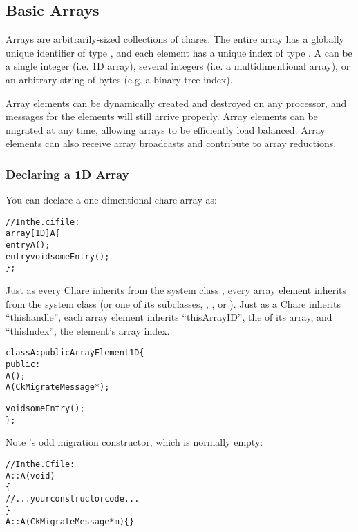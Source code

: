 \subsection{Basic Arrays}

Arrays  are arbitrarily-sized collections of chares.  The
entire array has a globally unique identifier of type , and
each element has a unique index of type .  A 
can be a single integer (i.e. 1D array), several integers (i.e. a
multidimentional array), or an arbitrary string of bytes (e.g. a binary tree
index).

Array elements can be dynamically created and destroyed on any processor,
and messages for the elements will still arrive properly.
Array elements can be migrated at any time, allowing arrays to be efficiently
load balanced.  Array elements can also receive array broadcasts and
contribute to array reductions.

\subsubsection{Declaring a 1D Array}

You can declare a one-dimentional chare array
as:

\begin{alltt}
//In the .ci file:
array [1D] A \{
  entry A();
  entry void someEntry();
\};
\end{alltt}

Just as every Chare inherits from the system class , every 
array element inherits from the system class  (or one
of its subclasses, , , or 
). Just as a Chare inherits ``thishandle'', each
array element inherits ``thisArrayID'', the  of its array,
and ``thisIndex'', the element's array index.

\begin{alltt}
class A : public ArrayElement1D \{
  public:
    A();
    A(CkMigrateMessage *);

    void someEntry();
\};
\end{alltt}

Note 's odd migration constructor, which is normally empty:

\begin{alltt}
//In the .C file:
A::A(void)
\{
  //...your constructor code...
\}
A::A(CkMigrateMessage *m) \{ \}
\end{alltt}

